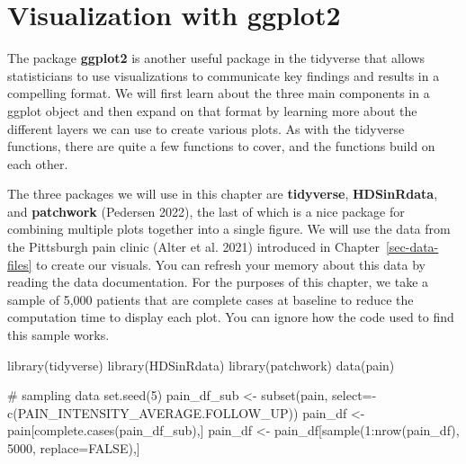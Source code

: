 \documentclass[
  letterpaper,
]{krantz}
\makeatletter
\newenvironment{Shaded}{\begin{snugshade}}{\end{snugshade}}
\newcommand{\AttributeTok}[1]{\textcolor[rgb]{0.40,0.45,0.13}{#1}}
\newcommand{\CommentTok}[1]{\textcolor[rgb]{0.37,0.37,0.37}{#1}}
\newcommand{\ConstantTok}[1]{\textcolor[rgb]{0.56,0.35,0.01}{#1}}
\newcommand{\DecValTok}[1]{\textcolor[rgb]{0.68,0.00,0.00}{#1}}
\newcommand{\FunctionTok}[1]{\textcolor[rgb]{0.28,0.35,0.67}{#1}}
\newcommand{\NormalTok}[1]{\textcolor[rgb]{0.00,0.23,0.31}{#1}}
\newcommand{\OtherTok}[1]{\textcolor[rgb]{0.00,0.23,0.31}{#1}}
\newcommand{\SpecialCharTok}[1]{\textcolor[rgb]{0.37,0.37,0.37}{#1}}
\newenvironment{kframe}{%
\medskip{}
\setlength{\fboxsep}{.8em}
 \def\at@end@of@kframe{}%
 \ifinner\ifhmode%
  \def\at@end@of@kframe{\end{minipage}}%
  \begin{minipage}{\columnwidth}%
 \fi\fi%
 \def\FrameCommand##1{\hskip\@totalleftmargin \hskip-\fboxsep
 \colorbox{shadecolor}{##1}\hskip-\fboxsep
     \hskip-\linewidth \hskip-\@totalleftmargin \hskip\columnwidth}%
 \MakeFramed {\advance\hsize-\width
   \@totalleftmargin\z@ \linewidth\hsize
   \@setminipage}}%
 {\par\unskip\endMakeFramed%
 \at@end@of@kframe}
\renewenvironment{Shaded}{\begin{kframe}}{\end{kframe}}
\makeatother
\begin{document}
\chapter{Visualization with ggplot2}\label{sec-ggplot2}

The package \textbf{ggplot2} is another useful package in the tidyverse
that allows statisticians to use visualizations to communicate key
findings and results in a compelling format. We will first learn about
the three main components in a ggplot object and then expand on that
format by learning more about the different layers we can use to create
various plots. As with the tidyverse functions, there are quite a few
functions to cover, and the functions build on each other.

The three packages we will use in this chapter are \textbf{tidyverse},
\textbf{HDSinRdata}, and \textbf{patchwork} (Pedersen 2022), the last of
which is a nice package for combining multiple plots together into a
single figure. We will use the data from the Pittsburgh pain clinic
(Alter et al. 2021) introduced in Chapter~\ref{sec-data-files} to create
our visuals. You can refresh your memory about this data by reading the
data documentation. For the purposes of this chapter, we take a sample
of 5,000 patients that are complete cases at baseline to reduce the
computation time to display each plot. You can ignore how the code used
to find this sample works.

\begin{Shaded}
\begin{Highlighting}[]
\FunctionTok{library}\NormalTok{(tidyverse)}
\FunctionTok{library}\NormalTok{(HDSinRdata)}
\FunctionTok{library}\NormalTok{(patchwork)}
\FunctionTok{data}\NormalTok{(pain)}

\CommentTok{\# sampling data}
\FunctionTok{set.seed}\NormalTok{(}\DecValTok{5}\NormalTok{)}
\NormalTok{pain\_df\_sub }\OtherTok{\textless{}{-}} \FunctionTok{subset}\NormalTok{(pain, }
                      \AttributeTok{select=}\SpecialCharTok{{-}}\FunctionTok{c}\NormalTok{(PAIN\_INTENSITY\_AVERAGE.FOLLOW\_UP))}
\NormalTok{pain\_df }\OtherTok{\textless{}{-}}\NormalTok{ pain[}\FunctionTok{complete.cases}\NormalTok{(pain\_df\_sub),]}
\NormalTok{pain\_df }\OtherTok{\textless{}{-}}\NormalTok{ pain\_df[}\FunctionTok{sample}\NormalTok{(}\DecValTok{1}\SpecialCharTok{:}\FunctionTok{nrow}\NormalTok{(pain\_df), }\DecValTok{5000}\NormalTok{, }\AttributeTok{replace=}\ConstantTok{FALSE}\NormalTok{),] }
\end{Highlighting}
\end{Shaded}
\end{document}
